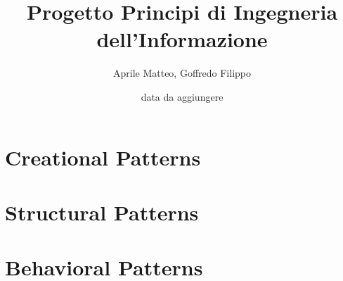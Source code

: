 \documentclass{report}
\title{Progetto Principi di Ingegneria dell'Informazione}
\author{Aprile Matteo, Goffredo Filippo}
\date{data da aggiungere}
\begin{document}
    \maketitle
    \tableofcontents

    \part{Creational Patterns}
    
    
    
    
    \part{Structural Patterns}
    
    
    

    \part{Behavioral Patterns}
    
    
    
    
\end{document}
